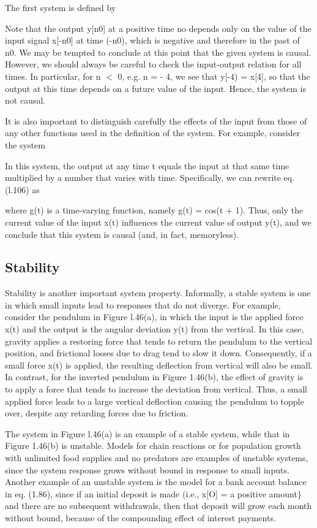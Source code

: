 \documentclass{report}
\begin{document}
The first system is defined by



Note that the output y[n0] at a positive time no depends only on the value of the input signal x[-n0] at time (-n0), which is negative and therefore
in the past of n0. We may be tempted to conclude at this point that the given system is causal. However, we should always be careful to check the
input-output relation for all times. In particular, for n $<$ 0, e.g. n = - 4, we see that y[-4) = x[4], so that the output at this time depends
on a future value of the input. Hence, the system is not causal.

It is also important to distinguish carefully the effects of the input from those of any other functions used in the definition of the system. For
example, consider the system



In this system, the output at any time t equals the input at that same time multiplied by a number that varies with time. Specifically, we can rewrite
eq. (l.106) as



where g(t) is a time-varying function, namely g(t) = cos(t + 1). Thus, only the current value of the input x(t) influences the current value of {
} { } output y(t), and we conclude that this system is causal (and, in fact, memoryless).

\subsection*{Stability}

Stability is another important system property. Informally, a stable system is one in which small inputs lead to responses that do not diverge. For
example, consider the pendulum in Figure l.46(a), in which the input is the applied force x(t) and the output is the angular deviation y(t) from
the vertical. In this case, gravity applies a restoring force that tends to return the pendulum to the vertical position, and frictional losses due
to drag tend to slow it down. Consequently, if a small force x(t) is applied, the resulting deflection from vertical will also be small. In contrast,
for the inverted pendulum in Figure 1.46(b), the effect of gravity is to apply a force that tends to increase the deviation from vertical. Thus,
a small applied force leads to a large vertical deflection causing the pendulum to topple over, despite any retarding forces due to friction.

The system in Figure l.46(a) is an example of a stable system, while that in Figure 1.46(b) is unstable. Models for chain reactions or for population
growth with unlimited food supplies and no predators are examples of unstable systems, since the system response grows without bound in response
to small inputs. Another example of an unstable system is the model for a bank account balance in eq. (1.86), since if an initial deposit is made
(i.e., x[O] = a positive amount$\}$ and there are no subsequent withdrawals, then that deposit will grow each month without bound, because of the
compounding effect of interest payments.
\end{document}
